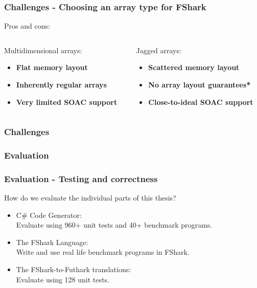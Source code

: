 \documentclass[10pt, compress, usenames, dvipsnames]{beamer}
\begin{document}
\begin{frame}[fragile]
  \frametitle{Challenges - Choosing an array type for FShark}
  Pros and cons:\\
  \begin{columns}
    \begin{column}{.48\textwidth}
      Multidimensional arrays:\\
      \begin{itemize}
      \item<1-> {\color{ForestGreen} \textbf{Flat memory layout}}
      \item<2-> {\color{ForestGreen} \textbf{Inherently regular arrays}}
      \item<3-> {\color{red} \textbf{Very limited SOAC support}}
      \end{itemize}
    \end{column}
    \begin{column}{.48\textwidth}
      Jagged arrays:\\
      \begin{itemize}
      \item<1-> {\color{red} \textbf{Scattered memory layout}}
      \item<2-> {\color{red} \textbf{No array layout guarantees*}} 
      \item<3-> {\color{ForestGreen} \textbf{Close-to-ideal SOAC support}}
      \end{itemize}
    \end{column}
  \end{columns}
\end{frame}

\begin{frame}[fragile]
  \frametitle{Challenges}
\end{frame}

\begin{frame}[fragile]
  \frametitle{Evaluation}
\end{frame}

\begin{frame}[fragile]
  \frametitle{Evaluation - Testing and correctness}
  How do we evaluate the individual parts of this thesis?
  \begin{itemize}
  \item<2-> C\# Code Generator:\\
    Evaluate using 960+ unit tests and 40+ benchmark programs.
\item<3-> The FShark Language:\\
  Write and use real life benchmark programs in FShark.
\item<4-> The FShark-to-Futhark translations:\\
  Evaluate using 128 unit tests.
  \end{itemize}
\end{frame}
\end{document}
